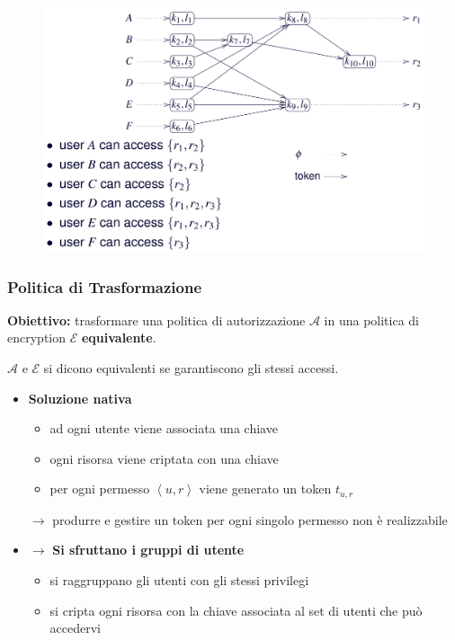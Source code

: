 \documentclass{report}
\begin{document}
\begin{figure}[ht]
    \centering
    \includegraphics[width=1\linewidth]{images/encryption/encryption-policy-graph.png}
\end{figure}
 
\subsubsection{Politica di Trasformazione}
\textbf{Obiettivo:} trasformare una politica di autorizzazione $\mathcal{A}$
in una politica di encryption $\mathcal{E}$ \textbf{equivalente}.

\noindent $\mathcal{A}$ e $\mathcal{E}$ si dicono equivalenti se
garantiscono gli stessi accessi.

\begin{itemize}
    \item \textbf{Soluzione nativa}
    \begin{itemize}
        \item ad ogni utente viene associata una chiave 
        \item ogni risorsa viene criptata con una chiave
        \item per ogni permesso $\left\langle u,r \right\rangle$ viene generato un token $t_{u,r}$
    \end{itemize}

    $\rightarrow$ produrre e gestire un token per ogni singolo permesso non è realizzabile
    \item $\rightarrow$ \textbf{Si sfruttano i gruppi di utente}
    \begin{itemize}
        \item si raggruppano gli utenti con gli stessi privilegi
        \item si cripta ogni risorsa con la chiave associata al set di utenti che può accedervi
    \end{itemize}
\end{itemize}
\end{document}
